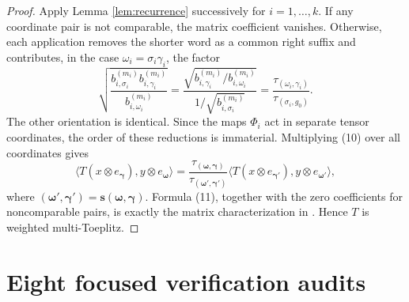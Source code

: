\documentclass[11pt]{article}
\begin{document}
\begin{proof}
Apply Lemma \ref{lem:recurrence} successively for $i=1,\dots,k$.  If any coordinate pair is not comparable, the matrix coefficient vanishes.  Otherwise, each application removes the shorter word as a common right suffix and contributes, in the case $\omega_i=\sigma_i\gamma_i$, the factor
\[
 \sqrt{\frac{b_{i,\sigma_i}^{(m_i)}b_{i,\gamma_i}^{(m_i)}}
              {b_{i,\omega_i}^{(m_i)}}}
 =\frac{\sqrt{b_{i,\gamma_i}^{(m_i)}/b_{i,\omega_i}^{(m_i)}}}
        {1/\sqrt{b_{i,\sigma_i}^{(m_i)}}}
 =\frac{\tau_{(\omega_i,\gamma_i)}}
        {\tau_{(\sigma_i,g_0)}}.                                   \tag{10}
\]
The other orientation is identical.  Since the maps $\Phi_i$ act in separate tensor coordinates, the order of these reductions is immaterial.  Multiplying (10) over all coordinates gives
\[
\langle T(x\otimes e_{\boldsymbol\gamma}),y\otimes e_{\boldsymbol\omega}\rangle
=\frac{\tau_{(\boldsymbol\omega,\boldsymbol\gamma)}}
       {\tau_{(\boldsymbol\omega',\boldsymbol\gamma')}}
 \langle T(x\otimes e_{\boldsymbol\gamma'}),
              y\otimes e_{\boldsymbol\omega'}\rangle,             \tag{11}
\]
where $(\boldsymbol\omega',\boldsymbol\gamma')=\mathbf s(\boldsymbol\omega,\boldsymbol\gamma)$.  Formula (11), together with the zero coefficients for noncomparable pairs, is exactly the matrix characterization in \cite[Proposition 1.3]{Popescu}.  Hence $T$ is weighted multi-Toeplitz.
\end{proof}

\section*{Eight focused verification audits}
\end{document}
